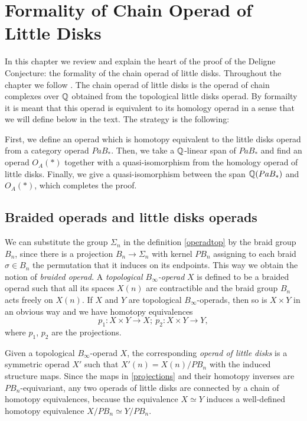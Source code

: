 \documentclass[TFM.tex]{subfiles}
\begin{document}
\chapter{Formality of Chain Operad of Little Disks}\label{4}



%
%
%


In this chapter we review and explain the heart of the proof of the Deligne Conjecture: the formality of the chain operad of little disks. Throughout the chapter we follow \cite{Tamarkin}. The chain operad of little disks is the operad of chain complexes over $\mathbb{Q}$ obtained from the topological little disks operad. By formailty it is meant that this operad is equivalent to its homology operad in a sense that we will define below in the text. The strategy is the following:

 First, we define an operad which is homotopy equivalent to the little disks operad from a category operad $PaB_*$. Then, we take a $\mathbb{Q}$-linear span of $PaB_*$ and find an operad $O_A(*)$ together with a quasi-isomorphism from the homology operad of little disks. Finally, we give a quasi-isomorphism between the span $\mathbb{Q}(PaB_*)$ and $O_A(*)$, which completes the proof. 




\section{Braided operads and little disks operads}

We can substitute the group $\Sigma_n$ in the definition \ref{operadtop} by the braid group $B_n$, since there is a projection $B_n\to \Sigma_n$ with kernel $PB_n$ assigning to each braid $\sigma\in B_n$ the permutation that it induces on its endpoints. This way we obtain the notion of \emph{braided operad}. A \emph{topological $B_\infty$-operad} $X$ is defined to be a braided operad such that all its spaces $X(n)$ are contractible and the braid group $B_n$ acts freely on $X(n)$. If $X$ and $Y$ are topological $B_\infty$-operads, then so is $X\times Y$ in an obvious way and we have homotopy equivalences 
\begin{equation}\label{projections}
p_1:X\times Y\to X;\ p_2:X\times Y\to Y,
\end{equation}
where $p_1$, $p_2$ are the projections. 

Given a topological $B_\infty$-operad $X$, the corresponding \emph{operad of little disks} is a symmetric operad $X'$ such that $X'(n)=X(n)/PB_n$ with the induced structure maps. Since the maps in \ref{projections} and their homotopy inverses are $PB_n$-equivariant, any two operads of little disks are connected by a chain of homotopy equivalences, because the equivalence $X\simeq Y$ induces a well-defined homotopy equivalence $X/PB_n\simeq Y/PB_n$. 
\end{document}
